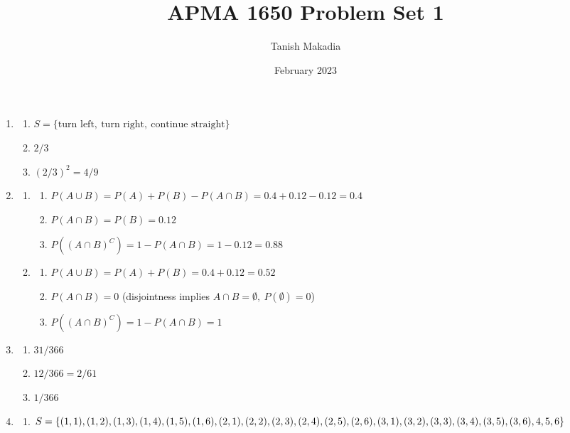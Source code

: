 \documentclass[12pt,reqno]{article}
\title{APMA 1650 Problem Set 1}
\author{Tanish Makadia}
\date{February 2023}
\theoremstyle{plain}
\theoremstyle{definition}
\begin{document}
\maketitle


\begin{enumerate}
    \item \begin{enumerate}
            \item \(S = \{\text{turn left},\ \text{turn right},\ \text{continue straight}\}\)
            \item \(2/3\)
            \item \((2/3)^2=4/9\) \bigskip
    \end{enumerate}
    \item \begin{enumerate}
        \item \begin{enumerate}
            \item \(P(A\cup B) = P(A) + P(B) - P(A\cap B)=0.4+0.12-0.12=0.4\)
            \item \(P(A\cap B) = P(B) = 0.12\)
            \item \(P((A\cap B)^C)=1-P(A\cap B)=1-0.12=0.88\)
        \end{enumerate}
        \item \begin{enumerate}
            \item \(P(A\cup B) = P(A) + P(B) =0.4+0.12=0.52\)
            \item \(P(A\cap B) = 0\) (disjointness implies \(A\cap B=\emptyset,\ P(\emptyset)=0\))
            \item \(P((A\cap B)^C)=1 - P(A\cap B) = 1\) \bigskip
        \end{enumerate}
    \end{enumerate}
    \item \begin{enumerate}
        \item \(31/366\)
        \item \(12/366=2/61\)
        \item \(1/366\) \bigskip
    \end{enumerate}
    \item \begin{enumerate}
        \item \(S = \{(1,1),(1,2),(1,3),(1,4),(1,5),(1,6),(2,1),(2,2),(2,3),(2,4),(2,5),\\(2,6),(3,1),(3,2),(3,3),(3,4),(3,5),(3,6),4,5,6\}\)

\end{enumerate}
\end{enumerate}
\end{document}
